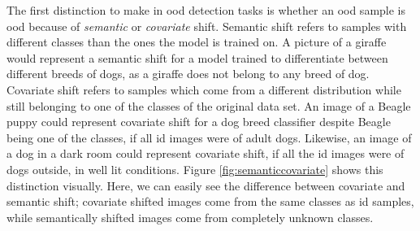 \documentclass[UKenglish]{uiomasterthesis} %
\theoremstyle{definition}
\begin{document}
The first distinction to make in \ac{ood} detection tasks is whether an \ac{ood} sample is \ac{ood} because of {\it semantic} or {\it covariate} shift. Semantic shift refers to samples with different classes than the ones the model is trained on. A picture of a giraffe would represent a semantic shift for a model trained to differentiate between different breeds of dogs, as a giraffe does not belong to any breed of dog. Covariate shift refers to samples which come from a different distribution while still belonging to one of the classes of the original data set. An image of a Beagle puppy could represent covariate shift for a dog breed classifier despite Beagle being one of the classes, if all \ac{id} images were of adult dogs. Likewise, an image of a dog in a dark room could represent covariate shift, if all the \ac{id} images were of dogs outside, in well lit conditions. Figure \ref{fig:semanticcovariate} shows this distinction visually. Here, we can easily see the difference between covariate and semantic shift; covariate shifted images come from the same classes as \ac{id} samples, while semantically shifted images come from completely unknown classes.
\end{document}
